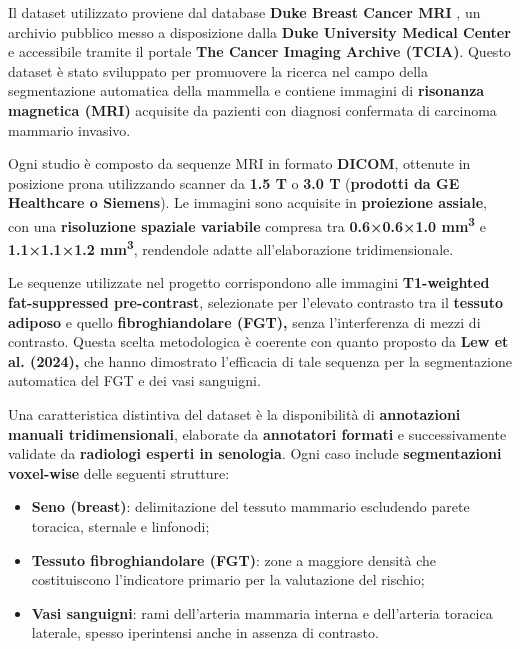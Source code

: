

Il dataset utilizzato proviene dal database \textbf{Duke Breast Cancer MRI} \cite{duke_breast_mri}, un archivio pubblico messo a disposizione dalla \textbf{Duke University Medical Center} e accessibile tramite il portale \textbf{The Cancer Imaging Archive (TCIA)}. Questo dataset è stato sviluppato per promuovere la ricerca nel campo della segmentazione automatica della mammella e contiene immagini di \textbf{risonanza magnetica (MRI)} acquisite da pazienti con diagnosi confermata di carcinoma mammario invasivo.

Ogni studio è composto da sequenze MRI in formato \textbf{DICOM}, ottenute in posizione prona utilizzando scanner da \textbf{1.5 T} o \textbf{3.0 T} (\textbf{prodotti da GE Healthcare o Siemens}). Le immagini sono acquisite in \textbf{proiezione assiale}, con una \textbf{risoluzione spaziale variabile} compresa tra \textbf{0.6×0.6×1.0 mm\textsuperscript{3}} e \textbf{1.1×1.1×1.2 mm\textsuperscript{3}}, rendendole adatte all'elaborazione tridimensionale.

Le sequenze utilizzate nel progetto corrispondono alle immagini \textbf{T1-weighted fat-suppressed pre-contrast}, selezionate per l’elevato contrasto tra il \textbf{tessuto adiposo} e quello \textbf{fibroghiandolare (FGT),} senza l’interferenza di mezzi di contrasto. Questa scelta metodologica è coerente con quanto proposto da \textbf{Lew et al. (2024),} che hanno dimostrato l’efficacia di tale sequenza per la segmentazione automatica del FGT e dei vasi sanguigni.

Una caratteristica distintiva del dataset è la disponibilità di \textbf{annotazioni manuali tridimensionali}, elaborate da \textbf{annotatori formati} e successivamente validate da \textbf{radiologi esperti in senologia}. Ogni caso include \textbf{segmentazioni voxel-wise} delle seguenti strutture:
\begin{itemize}
\item \textbf{Seno (breast)}: delimitazione del tessuto mammario escludendo parete toracica, sternale e linfonodi;
\item \textbf{Tessuto fibroghiandolare (FGT)}: zone a maggiore densità che costituiscono l’indicatore primario per la valutazione del rischio;
\item \textbf{Vasi sanguigni}: rami dell’arteria mammaria interna e dell’arteria toracica laterale, spesso iperintensi anche in assenza di contrasto.
\end{itemize}


